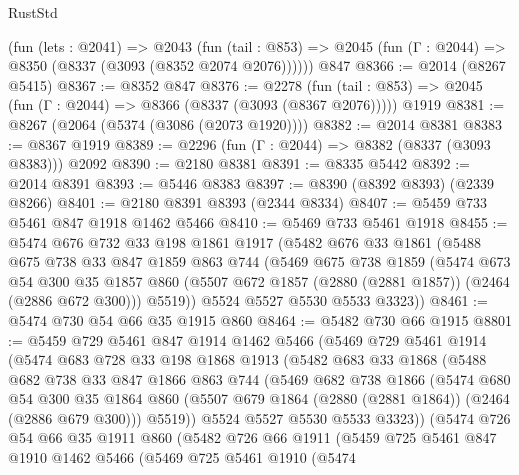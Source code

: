 \begin{lexlean}{RustStd}
\begin{coremodule}
    (fun (lets : @2041) =>
    @2043
      (fun (tail : @853) => @2045 (fun (Γ : @2044) => @8350 (@8337 (@3093 (@8352 @2074 @2076))))))
    @847
@8366 := @2014 (@8267 @5415)
@8367 := @8352 @847
@8376 := @2278
    (fun (tail : @853) => @2045 (fun (Γ : @2044) => @8366 (@8337 (@3093 (@8367 @2076)))))
    @1919
@8381 := @8267 (@2064 (@5374 (@3086 (@2073 @1920))))
@8382 := @2014 @8381
@8383 := @8367 @1919
@8389 := @2296 (fun (Γ : @2044) => @8382 (@8337 (@3093 @8383))) @2092
@8390 := @2180 @8381
@8391 := @8335 @5442
@8392 := @2014 @8391
@8393 := @5446 @8383
@8397 := @8390 (@8392 @8393) (@2339 @8266)
@8401 := @2180 @8391 @8393 (@2344 @8334)
@8407 := @5459 @733 @5461 @847 @1918 @1462 @5466
@8410 := @5469 @733 @5461 @1918
@8455 := @5474
    @676
    @732
    @33
    @198
    @1861
    @1917
    (@5482
      @676
      @33
      @1861
      (@5488
        @675
        @738
        @33
        @847
        @1859
        @863
        @744
        (@5469
          @675
          @738
          @1859
          (@5474
            @673
            @54
            @300
            @35
            @1857
            @860
            (@5507 @672 @1857 (@2880 (@2881 @1857)) (@2464 (@2886 @672 @300)))
            @5519))
        @5524
        @5527
        @5530
        @5533
        @3323))
@8461 := @5474 @730 @54 @66 @35 @1915 @860
@8464 := @5482 @730 @66 @1915
@8801 := @5459
    @729
    @5461
    @847
    @1914
    @1462
    @5466
    (@5469
      @729
      @5461
      @1914
      (@5474
        @683
        @728
        @33
        @198
        @1868
        @1913
        (@5482
          @683
          @33
          @1868
          (@5488
            @682
            @738
            @33
            @847
            @1866
            @863
            @744
            (@5469
              @682
              @738
              @1866
              (@5474
                @680
                @54
                @300
                @35
                @1864
                @860
                (@5507 @679 @1864 (@2880 (@2881 @1864)) (@2464 (@2886 @679 @300)))
                @5519))
            @5524
            @5527
            @5530
            @5533
            @3323))
        (@5474
          @726
          @54
          @66
          @35
          @1911
          @860
          (@5482
            @726
            @66
            @1911
            (@5459
              @725
              @5461
              @847
              @1910
              @1462
              @5466
              (@5469
                @725
                @5461
                @1910
                (@5474

\end{coremodule}
\end{lexlean}
